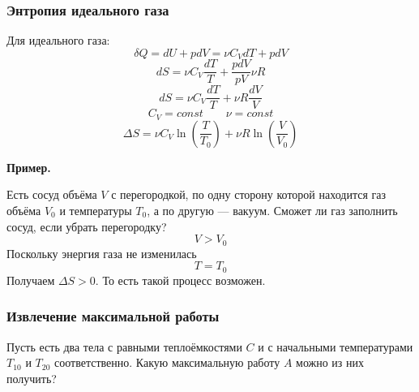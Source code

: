 \documentclass[12pt, a4paper]{article}%
\begin{document}
\subsubsection*{Энтропия идеального газа}
Для идеального газа:
\[\delta Q=dU+pdV=\nu C_VdT+pdV\]\[
dS=\nu C_V\frac{dT}{T}+\frac{pdV}{pV}\nu R\]\[
dS=\nu C_V\frac{dT}{T}+\nu R\frac{dV}{V}\]\[
C_V=const\qquad\nu=const\]\[
\Delta S=\nu C_V\ln\left(\frac{T}{T_0}\right)+\nu R\ln\left(\frac{V}{V_0}\right)
\]

\textbf{Пример.}

Есть сосуд объёма $V$ с перегородкой, по одну сторону которой находится газ объёма $V_0$ и температуры $T_0$, а по другую --- вакуум. Сможет ли газ заполнить сосуд, если убрать перегородку?
\[V>V_0\]Поскольку энергия газа не изменилась 
\[T=T_0\]Получаем $\Delta S>0$. То есть такой процесс возможен.


\subsubsection*{Извлечение максимальной работы}


Пусть есть два тела с равными теплоёмкостями $C$ и с начальными температурами $T_{10}$ и $T_{20}$ соответственно. Какую максимальную работу $A$ можно из них получить?
\end{document}
